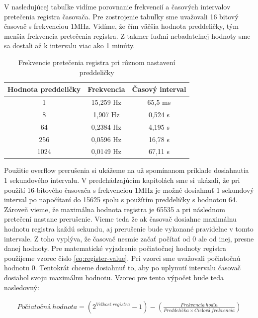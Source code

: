 V nasledujúcej tabuľke vidíme porovnanie frekvencií a časových intervalov pretečenia registra časovača. Pre zostrojenie tabuľky sme uvažovali 16 bitový časovač
s frekvenciou 1MHz.  Vidíme, že čím väčšia hodnota preddeličky, tým menšia frekvencia
pretečenia registra. Z takmer ľuďmi nebadateľnej hodnoty sme sa dostali až k intervalu viac ako 1 minúty.

\begin{table}[!htbp]
    \begin{center}
        \begin{tabular}{|c|c|c|}
            \hline
            Hodnota preddeličky & Frekvencia & Časový interval \\
            \hline
            1                   & 15,259 Hz  & 65,5 ms         \\
            8                   & 1,907 Hz   & 0,524 s         \\
            64                  & 0,2384 Hz  & 4,195 s         \\
            256                 & 0,0596 Hz  & 16,78 s         \\
            1024                & 0,0149 Hz  & 67,11 s         \\
            \hline
        \end{tabular}
        \caption{Frekvencie pretečenia registra pri rôznom nastavení preddeličky}
        \label{table:overflow-frequency}
    \end{center}
\end{table}

Použitie overflow prerušenia si ukážeme na už spomínanom príklade dosiahnutia 1 sekundového intervalu. V predchádzajúcim kapitolách sme si ukázali,
že pri použítí 16-bitového časovača s frekvenciou 1MHz je možné dosiahnuť 1 sekundový interval po napočítaní do 15625 spolu s použítím preddeličky s hodnotou 64.
Zároveň vieme, že maximálna hodnota registra je 65535 a pri následnom pretečení nastane prerušenie. Vieme teda že ak časovač dosiahne maximálnu hodnotu registra každú
sekundu, aj prerušenie bude vykonané pravidelne v tomto intervale. Z toho vyplýva, že časovač nesmie začať počítať od 0 ale od inej, presne danej hodnoty.
Pre matematické vyjadrenie počiatočnej hodnoty registra použijeme vzorec číslo \ref{eq:register-value}. Pri vzorci sme uvažovali počiatočnú hodnotu 0. Tentokrát chceme
dosiahnuť to, aby po uplynutí intervalu časovač dosiahol svoju maximálnu hodnotu. Vzorec pre tento výpočet bude teda nasledovný:

\begin{equation} \label{eq:start-value}
    \begin{aligned}
        Počiatočná\:hodnota =  (2^{Veľkosť\:registra} - 1) - (\frac{Frekvencia\:hodín}{Preddelička \times Cieľová\:frekvencia})
    \end{aligned}
\end{equation}

